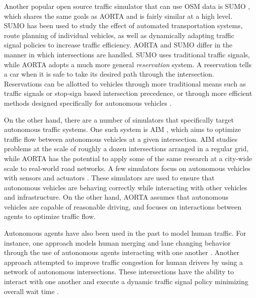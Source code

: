 \documentclass[letterpaper, 10 pt, conference]{ieeeconf}  %
\begin{document}

Another popular open source traffic simulator that can use OSM data is SUMO
\cite{SUMO2011}, which shares the same goals as AORTA and is fairly similar at
a high level. SUMO has been used to study the effect of automated
transportation systems, route planning of individual vehicles, as well as
dynamically adapting traffic signal policies to increase traffic efficiency.
AORTA and SUMO differ in the manner in which intersections are handled. SUMO
uses traditional traffic signals, while AORTA adopts a much more general
\textit{reservation} system. A reservation tells a car when it is safe to take
its desired path through the intersection. Reservations can be allotted to
vehicles through more traditional means such as traffic signals or stop-sign
based intersection precedence, or through more efficient methods designed
specifically for autonomous vehicles \cite{JAIR08-dresner}.

On the other hand, there are a number of simulators that specifically
target autonomous traffic systems. One such system is AIM
\cite{JAIR08-dresner}, which aims to optimize traffic flow between
autonomous vehicles at a given intersection. AIM studies problems at
the scale of roughly a dozen intersections arranged in a regular grid,
while AORTA has the potential to apply some of the same research at a
city-wide scale to real-world road networks. A few simulators focus on
autonomous vehicles with sensors and actuators
\cite{figueiredo2009approach}. These simulators are used to ensure
that autonomous vehicles are behaving correctly while interacting with
other vehicles and infrastructure. On the other hand, AORTA assumes
that autonomous vehicles are capable of reasonable driving, and
focuses on interactions between agents to optimize traffic flow.

Autonomous agents have also been used in the past to model human
traffic. For instance, one approach models human merging and lane
changing behavior through the use of autonomous agents interacting
with one another \cite{hidas2002modelling}. Another approach attempted
to improve traffic congestion for human drivers by using a network of
autonomous intersections.  These intersections have the ability to
interact with one another and execute a dynamic traffic signal policy
minimizing overall wait time \cite{manikonda2001autonomous}.
\end{document}
